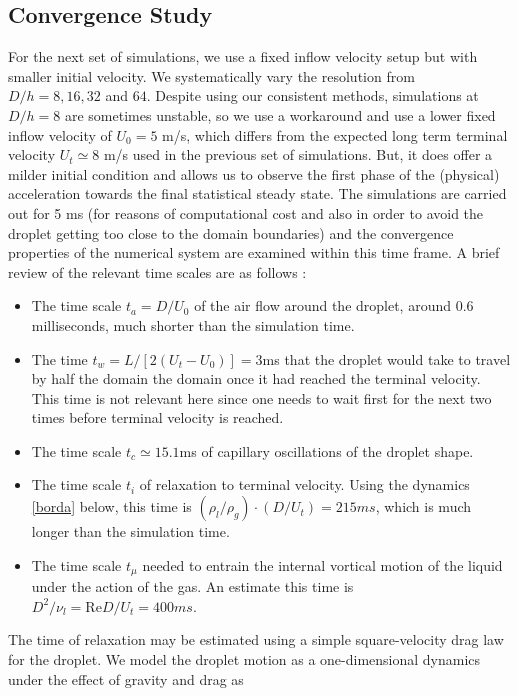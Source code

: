 \subsection*{Convergence Study}

For the next set of simulations, we use a fixed inflow velocity setup but with smaller initial velocity.
We systematically vary the resolution from  $D/h = 8, 16, 32 $ and $64$. 
Despite using our consistent methods, simulations at  $D/h = 8$ are sometimes unstable, 
so we use a workaround and use a lower fixed inflow velocity of $U_0=5$ m/s, 
which differs from the expected long term terminal velocity
$U_{t} \simeq $8 m/s used in the previous set of simulations. 
But, it does offer a milder initial condition and allows us to observe the first phase of the (physical)
acceleration towards the final statistical steady state. 
The simulations are carried out for 5 ms (for reasons of computational cost and also in order 
to avoid the droplet getting too close to the domain boundaries) 
and the convergence properties of the numerical system are examined within this time frame. 
A brief review of the relevant time scales are as follows : 

\begin{itemize}
\item The time scale $t_a=D/U_0$ of the air flow around the droplet, around 0.6 milliseconds, much shorter
than the simulation time. 
\item The time $t_w = L/[2(U_t - U_0)] = 3$ms that the droplet would take to travel by half the domain
  the domain once it had reached the terminal velocity. This time is not relevant here since one needs to wait first for the next two times
  before terminal velocity is reached. 
\item The time scale $t_c \simeq 15.1$ms \cite{rayleigh1879a} of capillary oscillations of the droplet shape.
\item The time scale $t_i$ of relaxation to terminal velocity. Using the dynamics \eqref{borda} below, 
	this time is $(\rho_l/\rho_g)\cdot( D/U_t) = 215 ms$, which is much longer than the simulation time. 
\item The time scale $t_\mu$ needed to entrain the internal vortical motion of the liquid under the action of the gas. An estimate this time is  $D^2/\nu_l =  \textrm{Re} D/U_t = 400 ms$.
\end{itemize}

The time of relaxation may be estimated using a simple square-velocity drag law for the droplet. 
We model the droplet motion as a one-dimensional dynamics under the effect of gravity and drag as

